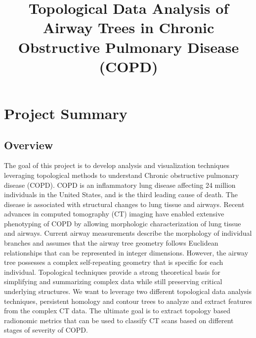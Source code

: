 \documentclass[11pt]{article}
\title{Topological Data Analysis of Airway Trees in Chronic Obstructive Pulmonary Disease (COPD)}
\date{}
\begin{document}
\maketitle

\clearpage
\section{Project Summary}

\subsection{Overview}
The goal of this project is to develop analysis and visualization techniques leveraging topological methods to understand Chronic obstructive pulmonary disease (COPD). COPD is an inflammatory lung disease affecting 24 million individuals in the United States, and is the third leading cause of death. 
The disease is associated with structural changes to lung tissue and airways. Recent advances in computed tomography (CT) imaging have enabled extensive phenotyping of COPD by allowing morphologic characterization of lung tissue and airways. Current airway measurements describe the morphology of individual branches and assumes that the airway tree geometry follows Euclidean relationships that can be represented in integer dimensions. However, the airway tree possesses a complex self-repeating geometry that is specific for each individual. Topological techniques provide a strong theoretical basis for simplifying and summarizing complex data while still preserving critical underlying structures. We want to leverage two different topological data analysis techniques, persistent homology and contour trees to analyze and extract features from the complex CT data. The ultimate goal is to extract topology based radionomic metrics that can be used to classify CT scans based on different stages of severity of COPD.
\end{document}
